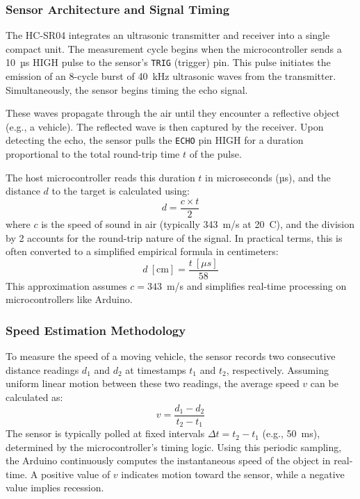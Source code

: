 \subsubsection{Sensor Architecture and Signal Timing}
The HC-SR04 integrates an ultrasonic transmitter and receiver into a single compact unit. The measurement cycle begins when the microcontroller sends a 10~µs HIGH pulse to the sensor's \texttt{TRIG} (trigger) pin. This pulse initiates the emission of an 8-cycle burst of 40~kHz ultrasonic waves from the transmitter. Simultaneously, the sensor begins timing the echo signal.

These waves propagate through the air until they encounter a reflective object (e.g., a vehicle). The reflected wave is then captured by the receiver. Upon detecting the echo, the sensor pulls the \texttt{ECHO} pin HIGH for a duration proportional to the total round-trip time $t$ of the pulse.

The host microcontroller reads this duration $t$ in microseconds (µs), and the distance $d$ to the target is calculated using:
\begin{equation}
  d = \frac{c \times t}{2}
  \label{eq:hc_distance_eq}
\end{equation}
where $c$ is the speed of sound in air (typically 343~m/s at 20~\textdegree C), and the division by 2 accounts for the round-trip nature of the signal. In practical terms, this is often converted to a simplified empirical formula in centimeters:
\begin{equation}
  d~[\text{cm}] = \frac{t~[\mu s]}{58}
  \label{eq:empirical_cm}
\end{equation}
This approximation assumes $c = 343$~m/s and simplifies real-time processing on microcontrollers like Arduino.

\subsubsection{Speed Estimation Methodology}
To measure the speed of a moving vehicle, the sensor records two consecutive distance readings $d_1$ and $d_2$ at timestamps $t_1$ and $t_2$, respectively. Assuming uniform linear motion between these two readings, the average speed $v$ can be calculated as:
\begin{equation}
  v = \frac{d_1 - d_2}{t_2 - t_1}
  \label{eq:hc_speed}
\end{equation}
The sensor is typically polled at fixed intervals $\Delta t = t_2 - t_1$ (e.g., 50~ms), determined by the microcontroller’s timing logic. Using this periodic sampling, the Arduino continuously computes the instantaneous speed of the object in real-time. A positive value of $v$ indicates motion toward the sensor, while a negative value implies recession.

